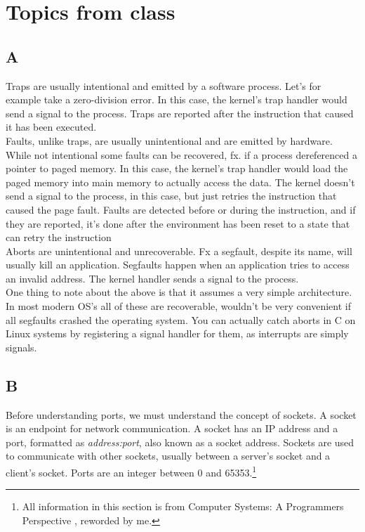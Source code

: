 \documentclass[11pt]{report}
\begin{document}
\chapter{Topics from class}
\section{A}
Traps are usually intentional and emitted by a software process. Let's for example take a zero-division error. In this case, the kernel's trap handler would send a signal to the process. Traps are reported after the instruction that caused it has been executed.\\[1ex]

Faults, unlike traps, are usually unintentional and are emitted by hardware. While not intentional some faults can be recovered, fx. if a process dereferenced a pointer to paged memory. In this case, the kernel's trap handler would load the paged memory into main memory to actually access the data. The kernel doesn't send a signal to the process, in this case, but just retries the instruction that caused the page fault. Faults are detected before or during the instruction, and if they are reported, it's done after the environment has been reset to a state that can retry the instruction\\[1ex]

Aborts are unintentional and unrecoverable. Fx a segfault, despite its name, will usually kill an application. Segfaults happen when an application tries to access an invalid address. The kernel handler sends a signal to the process.\\[1ex]

One thing to note about the above is that it assumes a very simple architecture. In most modern OS's all of these are recoverable, wouldn't be very convenient if all segfaults crashed the operating system. You can actually catch aborts in C on Linux systems\cite{catch-signal} by registering a signal handler for them, as interrupts are simply signals. 

\section{B}
Before understanding ports, we must understand the concept of sockets. A socket is an endpoint for network communication. A socket has an IP address and a port, formatted as \textit{address:port}, also known as a socket address. Sockets are used to communicate with other sockets, usually between a server's socket and a client's socket. Ports are an integer between 0 and 65353.\footnote{All information in this section is from Computer Systems: A Programmers Perspective \cite{computer-systems}, reworded by me.}\\[1ex]
\end{document}
